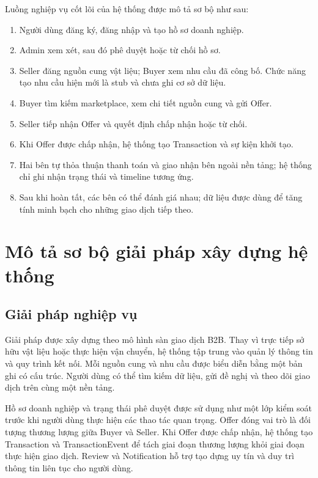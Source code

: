 \documentclass[12pt,a4paper,oneside]{report}
\begin{document}
Luồng nghiệp vụ cốt lõi của hệ thống được mô tả sơ bộ như sau:

\begin{enumerate}[leftmargin=1.1cm]
  \item Người dùng đăng ký, đăng nhập và tạo hồ sơ doanh nghiệp.
  \item Admin xem xét, sau đó phê duyệt hoặc từ chối hồ sơ.
  \item Seller đăng nguồn cung vật liệu; Buyer xem nhu cầu đã công bố. Chức năng
  tạo nhu cầu hiện mới là stub và chưa ghi cơ sở dữ liệu.
  \item Buyer tìm kiếm marketplace, xem chi tiết nguồn cung và gửi Offer.
  \item Seller tiếp nhận Offer và quyết định chấp nhận hoặc từ chối.
  \item Khi Offer được chấp nhận, hệ thống tạo Transaction và sự kiện khởi tạo.
  \item Hai bên tự thỏa thuận thanh toán và giao nhận bên ngoài nền tảng; hệ thống
  chỉ ghi nhận trạng thái và timeline tương ứng.
  \item Sau khi hoàn tất, các bên có thể đánh giá nhau; dữ liệu được dùng để tăng
  tính minh bạch cho những giao dịch tiếp theo.
\end{enumerate}

\section{Mô tả sơ bộ giải pháp xây dựng hệ thống}
\label{sec:giai-phap-so-bo}

\subsection{Giải pháp nghiệp vụ}

Giải pháp được xây dựng theo mô hình sàn giao dịch B2B. Thay vì trực tiếp sở hữu
vật liệu hoặc thực hiện vận chuyển, hệ thống tập trung vào quản lý thông tin và
quy trình kết nối. Mỗi nguồn cung và nhu cầu được biểu diễn bằng một bản ghi có
cấu trúc. Người dùng có thể tìm kiếm dữ liệu, gửi đề nghị và theo dõi giao dịch
trên cùng một nền tảng.

Hồ sơ doanh nghiệp và trạng thái phê duyệt được sử dụng như một lớp kiểm soát
trước khi người dùng thực hiện các thao tác quan trọng. Offer đóng vai trò là đối
tượng thương lượng giữa Buyer và Seller. Khi Offer được chấp nhận, hệ thống tạo
Transaction và TransactionEvent để tách giai đoạn thương lượng khỏi giai đoạn
thực hiện giao dịch. Review và Notification hỗ trợ tạo dựng uy tín và duy trì
thông tin liên tục cho người dùng.
\end{document}
